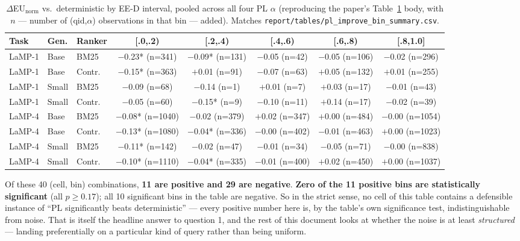 \documentclass[10pt]{article}
\begin{document}
\begin{table}[h]
\centering
\scriptsize
\begin{tabular}{@{}lllccccc@{}}
\toprule
Task & Gen. & Ranker & [.0,.2) & [.2,.4) & [.4,.6) & [.6,.8) & [.8,1.0] \\
\midrule
LaMP-1 & Base & BM25 & $-$0.23* (n{=}341) & $-$0.09* (n{=}131) & $-$0.05 (n{=}42) & $-$0.05 (n{=}106) & $-$0.02 (n{=}296) \\
LaMP-1 & Base & Contr. & $-$0.15* (n{=}363) & $+$0.01 (n{=}91) & $-$0.07 (n{=}63) & $+$0.05 (n{=}132) & $+$0.01 (n{=}255) \\
LaMP-1 & Small & BM25 & $-$0.09 (n{=}68) & $-$0.14 (n{=}1) & $+$0.01 (n{=}7) & $+$0.03 (n{=}17) & $-$0.01 (n{=}43) \\
LaMP-1 & Small & Contr. & $-$0.05 (n{=}60) & $-$0.15* (n{=}9) & $-$0.10 (n{=}11) & $+$0.14 (n{=}17) & $-$0.02 (n{=}39) \\
LaMP-4 & Base & BM25 & $-$0.08* (n{=}1040) & $-$0.02 (n{=}379) & $+$0.02 (n{=}347) & $+$0.00 (n{=}484) & $-$0.00 (n{=}1054) \\
LaMP-4 & Base & Contr. & $-$0.13* (n{=}1080) & $-$0.04* (n{=}336) & $-$0.00 (n{=}402) & $-$0.01 (n{=}463) & $+$0.00 (n{=}1023) \\
LaMP-4 & Small & BM25 & $-$0.11* (n{=}142) & $-$0.02 (n{=}47) & $-$0.01 (n{=}34) & $-$0.05 (n{=}71) & $-$0.00 (n{=}838) \\
LaMP-4 & Small & Contr. & $-$0.10* (n{=}1110) & $-$0.04* (n{=}335) & $-$0.01 (n{=}400) & $+$0.02 (n{=}450) & $+$0.00 (n{=}1037) \\
\bottomrule
\end{tabular}
\caption{$\Delta$EU$_{\text{norm}}$ vs.\ deterministic by EE-D interval, pooled
across all four PL $\alpha$ (reproducing the paper's Table~\ref{tab:baseline-repro}
body, with $n$ --- number of (qid,$\alpha$) observations in that bin --- added).
Matches \texttt{report/tables/pl\_improve\_bin\_summary.csv}.}
\label{tab:baseline-repro}
\end{table}

Of these 40 (cell, bin) combinations, \textbf{11 are positive and 29 are negative}.
\textbf{Zero of the 11 positive bins are statistically significant} (all
$p\geq0.17$); all 10 significant bins in the table are negative. So in the strict
sense, no cell of this table contains a defensible instance of ``PL significantly
beats deterministic'' --- every positive number here is, by the table's own
significance test, indistinguishable from noise. That is itself the headline
answer to question 1, and the rest of this document looks at whether the noise is
at least \emph{structured} --- landing preferentially on a particular kind of
query rather than being uniform.
\end{document}
